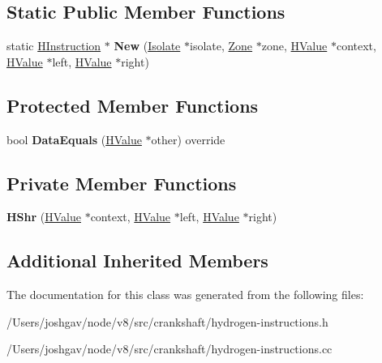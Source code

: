 \subsection*{Static Public Member Functions}
\begin{DoxyCompactItemize}
\item 
static \hyperlink{classv8_1_1internal_1_1_h_instruction}{H\+Instruction} $\ast$ {\bfseries New} (\hyperlink{classv8_1_1internal_1_1_isolate}{Isolate} $\ast$isolate, \hyperlink{classv8_1_1internal_1_1_zone}{Zone} $\ast$zone, \hyperlink{classv8_1_1internal_1_1_h_value}{H\+Value} $\ast$context, \hyperlink{classv8_1_1internal_1_1_h_value}{H\+Value} $\ast$left, \hyperlink{classv8_1_1internal_1_1_h_value}{H\+Value} $\ast$right)\hypertarget{classv8_1_1internal_1_1_h_shr_a8ce5b35d72869930f86818eac0970bea}{}\label{classv8_1_1internal_1_1_h_shr_a8ce5b35d72869930f86818eac0970bea}

\end{DoxyCompactItemize}
\subsection*{Protected Member Functions}
\begin{DoxyCompactItemize}
\item 
bool {\bfseries Data\+Equals} (\hyperlink{classv8_1_1internal_1_1_h_value}{H\+Value} $\ast$other) override\hypertarget{classv8_1_1internal_1_1_h_shr_a1f33fece3b5997132965bf646610ab2c}{}\label{classv8_1_1internal_1_1_h_shr_a1f33fece3b5997132965bf646610ab2c}

\end{DoxyCompactItemize}
\subsection*{Private Member Functions}
\begin{DoxyCompactItemize}
\item 
{\bfseries H\+Shr} (\hyperlink{classv8_1_1internal_1_1_h_value}{H\+Value} $\ast$context, \hyperlink{classv8_1_1internal_1_1_h_value}{H\+Value} $\ast$left, \hyperlink{classv8_1_1internal_1_1_h_value}{H\+Value} $\ast$right)\hypertarget{classv8_1_1internal_1_1_h_shr_ab938741ca40f8876959dd598d6d5c12c}{}\label{classv8_1_1internal_1_1_h_shr_ab938741ca40f8876959dd598d6d5c12c}

\end{DoxyCompactItemize}
\subsection*{Additional Inherited Members}


The documentation for this class was generated from the following files\+:\begin{DoxyCompactItemize}
\item 
/\+Users/joshgav/node/v8/src/crankshaft/hydrogen-\/instructions.\+h\item 
/\+Users/joshgav/node/v8/src/crankshaft/hydrogen-\/instructions.\+cc\end{DoxyCompactItemize}
